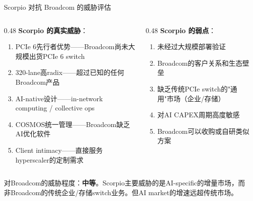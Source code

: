 \documentclass[UTF8,11pt,aspectratio=169]{beamer}
\begin{document}
\begin{frame}{Scorpio 对抗 Broadcom 的威胁评估}
    \begin{columns}[T]
        \begin{column}{0.48\textwidth}
            \textbf{Scorpio 的真实威胁}：
            \begin{enumerate}
                \item PCIe 6先行者优势——Broadcom尚未大规模出货PCIe 6 switch
                \item 320-lane高radix——超过已知的任何Broadcom产品
                \item AI-native设计——in-network computing / collective ops
                \item COSMOS统一管理——Broadcom缺乏AI优化软件
                \item Client intimacy——直接服务hyperscaler的定制需求
            \end{enumerate}
        \end{column}
        \begin{column}{0.48\textwidth}
            \textbf{Scorpio 的弱点}：
            \begin{enumerate}
                \item 未经过大规模部署验证
                \item Broadcom的客户关系和生态壁垒
                \item 缺乏传统PCIe switch的"通用"市场（企业/存储）
                \item 对AI CAPEX周期高度敏感
                \item Broadcom可以收购或自研类似方案
            \end{enumerate}
        \end{column}
    \end{columns}

    \vspace{0.3cm}
    \begin{keypoint}
        对Broadcom的威胁程度：\textbf{中等}。Scorpio主要威胁的是AI-specific的增量市场，而非Broadcom的传统企业/存储switch业务。但AI market的增速远超传统市场。
    \end{keypoint}
\end{frame}
\end{document}
